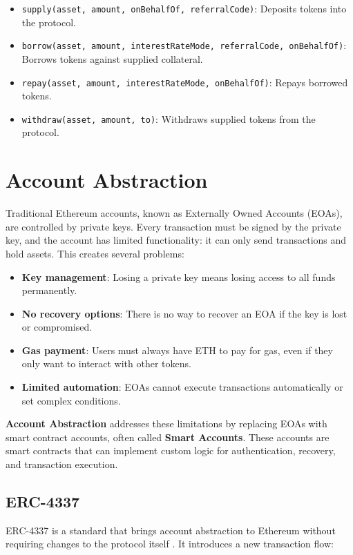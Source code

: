 \begin{itemize}
    \item \texttt{supply(asset, amount, onBehalfOf, referralCode)}: Deposits tokens into the protocol.
    \item \texttt{borrow(asset, amount, interestRateMode, referralCode, onBehalfOf)}: Borrows tokens against supplied collateral.
    \item \texttt{repay(asset, amount, interestRateMode, onBehalfOf)}: Repays borrowed tokens.
    \item \texttt{withdraw(asset, amount, to)}: Withdraws supplied tokens from the protocol.
\end{itemize}

\section{Account Abstraction}

Traditional Ethereum accounts, known as Externally Owned Accounts (EOAs), are controlled by private keys. Every transaction must be signed by the private key, and the account has limited functionality: it can only send transactions and hold assets. This creates several problems:

\begin{itemize}
    \item \textbf{Key management}: Losing a private key means losing access to all funds permanently.
    \item \textbf{No recovery options}: There is no way to recover an EOA if the key is lost or compromised.
    \item \textbf{Gas payment}: Users must always have ETH to pay for gas, even if they only want to interact with other tokens.
    \item \textbf{Limited automation}: EOAs cannot execute transactions automatically or set complex conditions.
\end{itemize}

\textbf{Account Abstraction} addresses these limitations by replacing EOAs with smart contract accounts, often called \textbf{Smart Accounts}. These accounts are smart contracts that can implement custom logic for authentication, recovery, and transaction execution.

\subsection{ERC-4337}

ERC-4337 is a standard that brings account abstraction to Ethereum without requiring changes to the protocol itself \cite{erc4337}. It introduces a new transaction flow:

